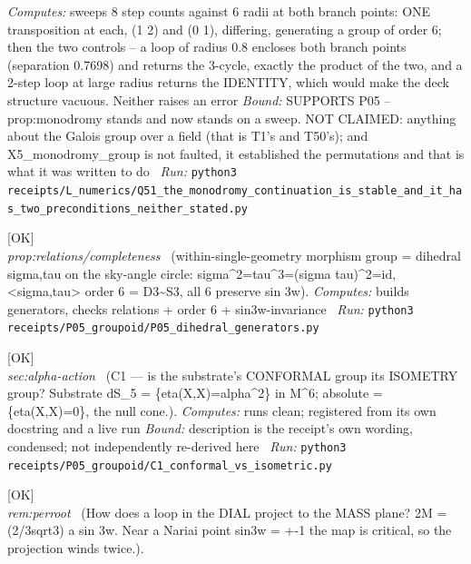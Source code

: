 \begin{description}
\emph{Computes:} sweeps 8 step counts against 6 radii at both branch points: ONE transposition at each, (1 2) and (0 1), differing, generating a group of order 6; then the two controls -- a loop of radius 0.8 encloses both branch points (separation 0.7698) and returns the 3-cycle, exactly the product of the two, and a 2-step loop at large radius returns the IDENTITY, which would make the deck structure vacuous. Neither raises an error
 \emph{Bound:} SUPPORTS P05 -- prop:monodromy stands and now stands on a sweep. NOT CLAIMED: anything about the Galois group over a field (that is T1's and T50's); and X5\_monodromy\_group is not faulted, it established the permutations and that is what it was written to do
\ \emph{Run:} \texttt{python3 receipts/L\_numerics/Q51\_the\_monodromy\_continuation\_is\_stable\_and\_it\_has\_two\_preconditions\_neither\_stated.py}
\item[\rcptlabel{P05_dihedral_generators}{P5R3}\textbf{P5R3}\quad\texttt{P05\_dihedral\_generators}]\hfill\textsf{[OK]}\\
\textit{prop:relations/completeness} \ (within-single-geometry morphism group = dihedral sigma,tau on the sky-angle circle: sigma\textasciicircum{}2=tau\textasciicircum{}3=(sigma tau)\textasciicircum{}2=id, <sigma,tau> order 6 = D3\textasciitilde{}S3, all 6 preserve sin 3w). 
\emph{Computes:} builds generators, checks relations + order 6 + sin3w-invariance
\ \emph{Run:} \texttt{python3 receipts/P05\_groupoid/P05\_dihedral\_generators.py}
\item[\rcptlabel{C1_conformal_vs_isometric}{P5R4}\textbf{P5R4}\quad\texttt{C1\_conformal\_vs\_isometric}]\hfill\textsf{[OK]}\\
\textit{sec:alpha-action} \ (C1 --- is the substrate's CONFORMAL group its ISOMETRY group? Substrate dS\_5 = \{eta(X,X)=alpha\textasciicircum{}2\} in M\textasciicircum{}6; absolute = \{eta(X,X)=0\}, the null cone.). 
\emph{Computes:} runs clean; registered from its own docstring and a live run
 \emph{Bound:} description is the receipt's own wording, condensed; not independently re-derived here
\ \emph{Run:} \texttt{python3 receipts/P05\_groupoid/C1\_conformal\_vs\_isometric.py}
\item[\rcptlabel{COVER_dial_loop_is_sigma_squared}{P5R5}\textbf{P5R5}\quad\texttt{COVER\_dial\_loop\_is\_sigma\_squared}]\hfill\textsf{[OK]}\\
\textit{rem:perroot} \ (How does a loop in the DIAL project to the MASS plane? 2M = (2/3sqrt3) a sin 3w. Near a Nariai point sin3w = +-1 the map is critical, so the projection winds twice.). 

\end{description}
